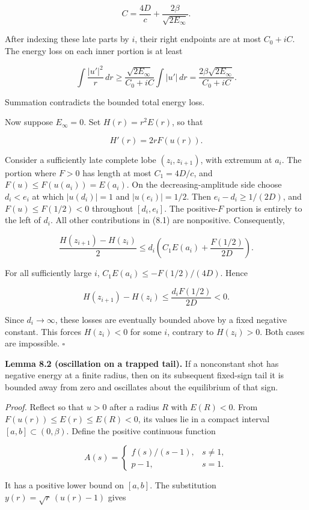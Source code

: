 \documentclass[11pt]{article}
\begin{document}
\[C=\frac{4D}{c}+\frac{2\beta}{\sqrt{2E_\infty}}.\]

After indexing these late parts by \(i\), their right endpoints are at
most \(C_0+iC\). The energy loss on each inner portion is at least

\[\int\frac{|u'|^2}{r}\,dr\geq\frac{\sqrt{2E_\infty}}{C_0+iC}\int |u'|\,dr
=\frac{2\beta\sqrt{2E_\infty}}{C_0+iC}.\]

Summation contradicts the bounded total energy loss.

Now suppose \(E_\infty=0\). Set \(H(r)=r^2E(r)\), so that

\[H'(r)=2rF(u(r)). \tag{8.1}\]

Consider a sufficiently late complete lobe \((z_i,z_{i+1})\), with
extremum at \(a_i\). The portion where \(F>0\) has length at most
\(C_1=4D/c\), and \(F(u)\leq F(u(a_i))=E(a_i)\). On the
decreasing-amplitude side choose \(d_i<e_i\) at which \(|u(d_i)|=1\) and
\(|u(e_i)|=1/2\). Then \(e_i-d_i\geq1/(2D)\), and \(F(u)\leq F(1/2)<0\)
throughout \([d_i,e_i]\). The positive-\(F\) portion is entirely to the
left of \(d_i\). All other contributions in (8.1) are nonpositive.
Consequently,

\[\frac{H(z_{i+1})-H(z_i)}2
\leq d_i\left(C_1E(a_i)+\frac{F(1/2)}{2D}\right).\]

For all sufficiently large \(i\), \(C_1E(a_i)\leq-F(1/2)/(4D)\). Hence

\[H(z_{i+1})-H(z_i)\leq\frac{d_iF(1/2)}{2D}<0.\]

Since \(d_i\to\infty\), these losses are eventually bounded above by a
fixed negative constant. This forces \(H(z_i)<0\) for some \(i\),
contrary to \(H(z_i)>0\). Both cases are impossible. \(\square\)

\textbf{Lemma 8.2 (oscillation on a trapped tail).} If a nonconstant
shot has negative energy at a finite radius, then on its subsequent
fixed-sign tail it is bounded away from zero and oscillates about the
equilibrium of that sign.

\emph{Proof.} Reflect so that \(u>0\) after a radius \(R\) with
\(E(R)<0\). From \(F(u(r))\leq E(r)\leq E(R)<0\), its values lie in a
compact interval \([a,b]\subset(0,\beta)\). Define the positive
continuous function

\[A(s)=\begin{cases}f(s)/(s-1),&s\ne1,\\p-1,&s=1.\end{cases}\]

It has a positive lower bound on \([a,b]\). The substitution
\(y(r)=\sqrt r\,(u(r)-1)\) gives
\end{document}
